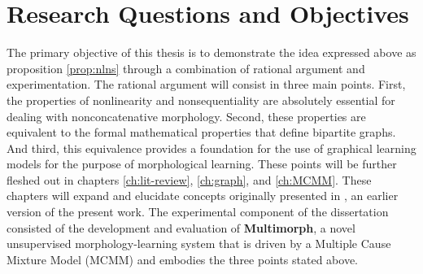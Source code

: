 
\section{Research Questions and Objectives}
The primary objective of this thesis is to demonstrate the idea expressed above as proposition \ref{prop:nlns} through a combination of rational argument and experimentation.
The rational argument will consist in three main points.
First, the properties of nonlinearity and nonsequentiality are absolutely essential for dealing with nonconcatenative morphology.
Second, these properties are equivalent to the formal mathematical properties that define bipartite graphs. And third, this equivalence provides a foundation for the use of graphical learning models for the purpose of morphological learning. 
These points will be further fleshed out in chapters \ref{ch:lit-review}, \ref{ch:graph}, and \ref{ch:MCMM}. These chapters will expand and elucidate concepts originally presented in \citet{meyer-and-dickinson:2016}, an earlier version of the present work.
The experimental component of the dissertation consisted of the development and evaluation of
 \textbf{Multimorph}, a novel unsupervised morphology-learning system that is driven by a Multiple Cause Mixture Model (MCMM) \citep{saund:94} and embodies the three points stated above. 
	
